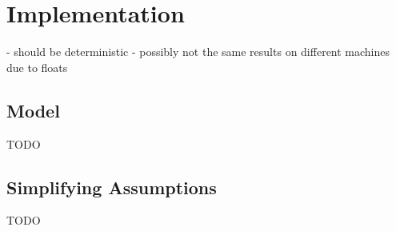 \chapter{Implementation}
- should be deterministic
- possibly not the same results on different machines due to floats
\section{Model}
TODO
\section{Simplifying Assumptions}
TODO
